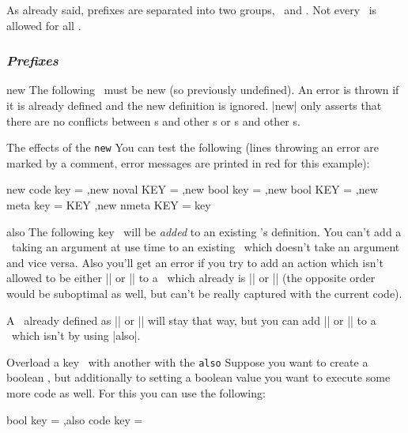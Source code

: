 As already said, prefixes are separated into two groups, \prefixes\ and \types.
Not every \prefix\ is allowed for all \types.


\subsubsection{\textit{Prefixes}\label{sec:d:prefixes}}

\begin{function}[module=expkv-def prefix]{new}
  The following \key\ must be new (so previously undefined). An error is thrown
  if it is already defined and the new definition is ignored. |new| only asserts
  that there are no conflicts between \Nkey{}s and other \Nkey{}s or \Vkey{}s
  and other \Vkey{}s.
\end{function}
\begin{example}{The effects of the \texttt{new} \prefix}
  You can test the following (lines throwing an error are marked by a comment,
  error messages are printed in red for this example):
  \expkvdocPrintErrors[\par]%
  \begin{enverb}[below]
      {
         new code  key = 
        ,new noval KEY = \domystuffwithoutarg
        ,new bool  key = \mybool %
        ,new bool  KEY = \mybool %
        ,new meta  key = {KEY}   %
        ,new nmeta KEY = {key}   %
      }
  \end{enverb}
\end{example}

\begin{function}[module=expkv-def prefix]{also}
  The following key \type\ will be \emph{added} to an existing \key's
  definition. You can't add a \type\ taking an argument at use time to an
  existing \key\ which doesn't take an argument and vice versa. Also you'll get
  an error if you try to add an action which isn't allowed to be either |\long|
  or |\protected| to a \key\ which already is |\long| or |\protected| (the
  opposite order would be suboptimal as well, but can't be really captured with
  the current code).

  A \key\ already defined as |\long| or |\protected| will stay that way, but you
  can add |\long| or |\protected| to a \key\ which isn't by using |also|.
\end{function}
\begin{example}
    {Overload a key \type\ with another with the \texttt{also} \prefix}
  Suppose you want to create a boolean \key, but additionally to setting a
  boolean value you want to execute some more code as well. For this you can use
  the following:
  \begin{enverb}[no-tcb]
      {
         bool key      = \ifmybool
        ,also code key = 
      }
  \end{enverb}
\end{example}

